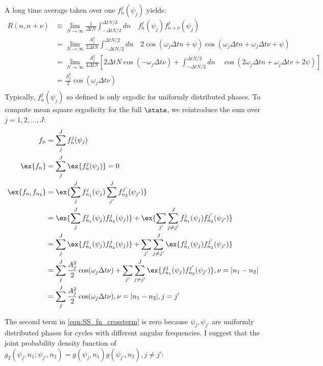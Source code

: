 A long time average taken over one $f^j_n(\psi_j)$ yields:
\begin{align}
R(n, n + \nu)  & \equiv \lim_{N \to \infty} \frac{1}{\Delta t N} \int_{-\Delta t N/2}^{\Delta t N/2} dn \quad  f^j_n(\psi_j) f^j_{n + \nu}(\psi_j)   \\
& = \lim_{N \to \infty} \frac{A_j^2}{2 \Delta t N} \int_{-\Delta t N/2}^{\Delta t N/2} dn \quad 2 \cos(\omega_j \Delta t n + \psi) \cos(\omega_j \Delta t n + \omega_j \Delta t \nu + \psi) \\
& = \lim_{N \to \infty} \frac{A_j^2}{4 \Delta t N} [ 2\Delta t N\cos(-\omega_j \Delta t \nu)   + \int_{-\Delta t N/2}^{\Delta t N/2} dn \quad \cos(2\omega_j \Delta t n + \omega_j \Delta t v + 2\psi) ]\\
& =  \frac{A_j^2}{2} \cos(\omega_j \Delta t \nu) \\
\end{align}
Typically, $f^j_n(\psi_j)$ so defined is only ergodic for uniformly distributed phases. To compute mean square ergodicity for the full $\state$, we reintroduce the sum over $j = 1, 2, ... , J$:
\begin{align}
f_n & = \sum_j^J f^j_n(\psi_j) \\
\ex{f_n} &= \sum_j^J \ex{f^j_n(\psi_j)} = 0 \\
\ex{f_{n_1}f_{n_2}} &=  \ex{\sum_j^J f^j_{n_1}(\psi_j) \sum_{j'}^{J} f^{j'}_{n_2}(\psi_{j'})}  \\
 & = \ex{\sum_j^J f^j_{n_1}(\psi_j) f^j_{n_2} (\psi_j)} + \ex{\sum_{j'}\sum_{j\neq j'}^J f^j_{n_1}(\psi_j) f^{j'}_{n_2}(\psi_{j'})} \\
  & = \sum_j^J \ex{f^j_{n_1}(\psi_j) f^j_{n_2}(\psi_j)} + \sum_{j'}\sum_{j\neq j'}^J \ex{f^j_{n_1}(\psi_j) f^{j'}_{n_2}(\psi_{j'})} \\
 & = \sum_j^J \frac{A_j^2}{2} \cos(\omega_j \Delta t \nu) + \sum_{j'}\sum_{j\neq j'}^J \ex{f^j_{n_1}(\psi_j) f^{j'}_{n_2}(\psi_{j'})}, \nu = |n_1 - n_2 |  \label{eqn:SS_fn_crossterm}\\
 & = \sum_j^J \frac{A_j^2}{2} \cos(\omega_j \Delta t \nu), \nu  = |n_1 - n_2 |, j = j'
\end{align}
 
The second term in \ref{eqn:SS_fn_crossterm} is zero because $\psi_j, \psi_{j'}$ are uniformly distributed phases for cycles with different angular frequencies.
 I suggest that the joint probability density function of $ g_2(\psi_j, n_1; \psi_{j'}, n_2) = g(\psi_j, n_1) g(\psi_{j'}, n_2), j \neq j'$:

